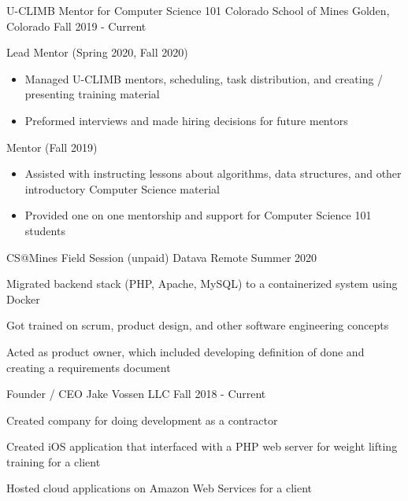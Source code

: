 \begin{cventries}
    \cventry
    	{U-CLIMB Mentor for Computer Science 101}
    	{ Colorado School of Mines }
    	{ Golden, Colorado}
	   	 {Fall 2019 - Current}
   	 {
   	 \begin{cvitems}
         \item {Lead Mentor (Spring 2020, Fall 2020)}
         \begin{itemize}
         \item {Managed U-CLIMB mentors, scheduling, task
    	distribution, and creating /
      presenting training material}
          \item {Preformed interviews and made hiring decisions for future mentors}
         \end{itemize}
         \ifcv
         \item {Mentor (Fall 2019)}
         \begin{itemize}
            	 \item {Assisted with instructing lessons about algorithms, data structures, and other introductory Computer Science material}
   	         \item {Provided one on one mentorship and support for
    	Computer Science 101 students}
        \end{itemize}
        \fi
      \end{cvitems}
      }

      \ifcv
    \cventry
    {CS@Mines Field Session (unpaid)}
    {Datava}
    {Remote}
    {Summer 2020}
    {
      \begin{cvitems}
        \item Migrated backend stack (PHP, Apache, MySQL) to a containerized system using Docker
        \item Got trained on scrum, product design, and other software engineering concepts
        \item Acted as product owner, which included developing definition of done and creating a requirements document
      \end{cvitems}
    }

    \cventry
    {Founder / CEO}
    { Jake Vossen LLC }
    {}
    {Fall 2018 - Current}
    {
      \begin{cvitems}
        \item {Created company for doing development as a contractor}
        \item {Created iOS application that interfaced with a PHP web server for weight lifting training for a client}
        \item {Hosted cloud applications on Amazon Web Services for a client}
      \end{cvitems}
    }
    


\end{cventries}
